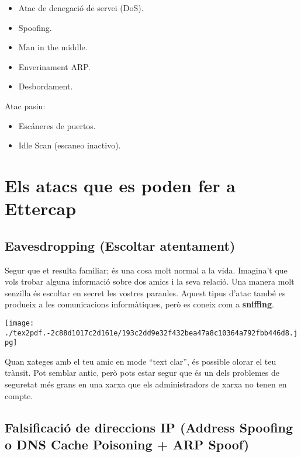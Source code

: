 \documentclass[]{article}
\begin{document}
\begin{itemize}
\item
  Atac de denegació de servei (DoS).
\item
  Spoofing.
\item
  Man in the middle.
\item
  Enverinament ARP.
\item
  Desbordament.
\end{itemize}

Atac pasiu:

\begin{itemize}
\item
  Escáneres de puertos.
\item
  Idle Scan (escaneo inactivo).
\end{itemize}

\hypertarget{els-atacs-que-es-poden-fer-a-ettercap}{%
\section{\texorpdfstring{\textbf{Els atacs que es poden fer a
Ettercap}}{Els atacs que es poden fer a Ettercap}}\label{els-atacs-que-es-poden-fer-a-ettercap}}

\hypertarget{eavesdropping-escoltar-atentament}{%
\subsection{\texorpdfstring{\textbf{Eavesdropping (Escoltar
atentament)}}{Eavesdropping (Escoltar atentament)}}\label{eavesdropping-escoltar-atentament}}

Segur que et resulta familiar; és una cosa molt normal a la vida.
Imagina't que vols trobar alguna informació sobre dos amics i la seva
relació. Una manera molt senzilla és escoltar en secret les vostres
paraules. Aquest tipus d'atac també es produeix a les comunicacions
informàtiques, però es coneix com a \textbf{sniffing}.

\texttt{[image: ./tex2pdf.-2c88d1017c2d161e/193c2dd9e32f432bea47a8c10364a792fbb446d8.jpg]}

Quan xateges amb el teu amic en mode ``text clar'', és possible olorar
el teu trànsit. Pot semblar antic, però pots estar segur que és un dels
problemes de seguretat més grans en una xarxa que els administradors de
xarxa no tenen en compte.

\hypertarget{falsificaciuxf3-de-direccions-ip-address-spoofing-o-dns-cache-poisoning-arp-spoof}{%
\subsection{\texorpdfstring{\textbf{Falsificació de direccions IP
(Address Spoofing o DNS Cache Poisoning + ARP
Spoof)}}{Falsificació de direccions IP (Address Spoofing o DNS Cache Poisoning + ARP Spoof)}}\label{falsificaciuxf3-de-direccions-ip-address-spoofing-o-dns-cache-poisoning-arp-spoof}}
\end{document}
